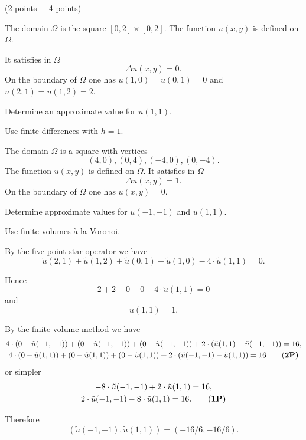 (2 points + 4 points)
\begin{teilaufgaben}
\item
The domain $\Omega$ is the square $[0,2] \times [0, 2]$.
The function $u(x,y)$ is defined on $\Omega$.

It satisfies in $\Omega$ 
\[
\Delta u(x,y) = 0.
\]
On the boundary of $\Omega$ one has $u(1,0) = u(0,1) = 0$ and
$u(2,1) = u(1,2) = 2$.

Determine an approximate value for $u(1,1)$.

Use finite differences with $h = 1$.

\item
The domain $\Omega$ is a square with vertices
\[
(4,0), (0,4), (-4, 0), (0,-4).
\]
The function $u(x,y)$ is defined on $\Omega$.
It satisfies in $\Omega$ 
\[
\Delta u(x,y) = 1.
\]
On the boundary of $\Omega$ one has $u(x,y) = 0$.

Determine approximate values for $u(-1,-1)$ and $u(1,1)$.

Use finite volumes \`a la Voronoi.  
\end{teilaufgaben}

\begin{loesung}
\begin{teilaufgaben}
\item
By the five-point-star operator we have
\begin{equation}
\tilde u(2,1)
+
\tilde u(1,2)
+
\tilde u(0,1)
+
\tilde u(1,0)
-
4 \cdot    \tilde u(1,1)
=
0.
\tag{\bf 1P}
\end{equation}

Hence
\[
2 + 2 + 0 + 0 - 4 \cdot \tilde u(1,1) = 0
\]
and
\begin{equation}
\tilde u(1,1) = 1.
\tag{\bf 1P}
\end{equation}

\item
By the finite volume method we have
\begin{gather}
4 \cdot (0 - \tilde u(-1,-1)) + (0 - \tilde u(-1,-1))
+ (0 - \tilde u(-1,-1)) + 2 \cdot (\tilde u(1,1) - \tilde u(-1,-1))
=
16,
\notag
\\
4 \cdot (0 - \tilde u(1,1)) + (0 - \tilde u(1,1))
+ (0 - \tilde u(1,1)) + 2 \cdot (\tilde u(-1,-1) - \tilde u(1,1))
=
16
\tag{\bf 2P}
\end{gather}
or simpler
\begin{gather}
-8 \cdot \tilde u(-1,-1) + 2 \cdot \tilde u(1,1) = 16,
\notag
\\
 2 \cdot \tilde u(-1,-1) -8 \cdot \tilde u(1,1) = 16.
\tag{\bf 1P}
\end{gather}

Therefore
\begin{equation}
(\tilde u(-1,-1), \tilde u(1,1)) = (-16/6, -16/6).
\tag{\bf 1P}
\end{equation}
\end{teilaufgaben}
\end{loesung}



